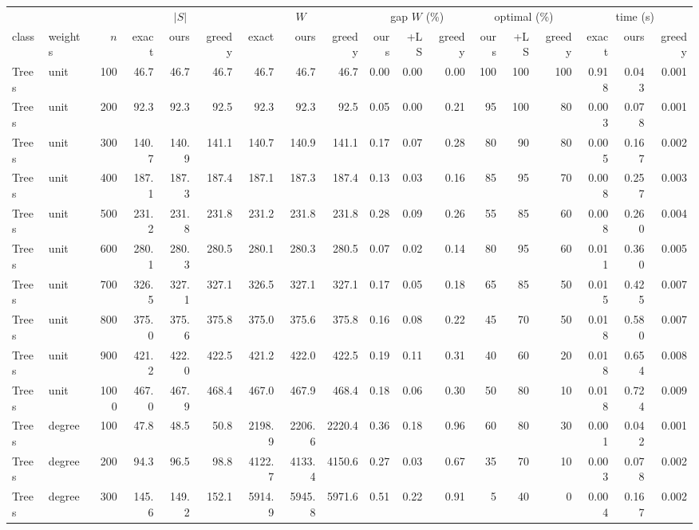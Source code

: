 \begin{tabular}{llr rrr rrr rrr rrr rrr}
\toprule
 & & & \multicolumn{3}{c}{$|S|$} & \multicolumn{3}{c}{$W$} & \multicolumn{3}{c}{gap $W$ (\%)} & \multicolumn{3}{c}{optimal (\%)} & \multicolumn{3}{c}{time (s)} \\
class & weights & $n$ & exact & ours & greedy & exact & ours & greedy & ours & +LS & greedy & ours & +LS & greedy & exact & ours & greedy \\
\midrule
Trees & unit & 100 & 46.7 & 46.7 & 46.7 & 46.7 & 46.7 & 46.7 & 0.00 & 0.00 & 0.00 & 100 & 100 & 100 & 0.918 & 0.043 & 0.001 \\
Trees & unit & 200 & 92.3 & 92.3 & 92.5 & 92.3 & 92.3 & 92.5 & 0.05 & 0.00 & 0.21 & 95 & 100 & 80 & 0.003 & 0.078 & 0.001 \\
Trees & unit & 300 & 140.7 & 140.9 & 141.1 & 140.7 & 140.9 & 141.1 & 0.17 & 0.07 & 0.28 & 80 & 90 & 80 & 0.005 & 0.167 & 0.002 \\
Trees & unit & 400 & 187.1 & 187.3 & 187.4 & 187.1 & 187.3 & 187.4 & 0.13 & 0.03 & 0.16 & 85 & 95 & 70 & 0.008 & 0.257 & 0.003 \\
Trees & unit & 500 & 231.2 & 231.8 & 231.8 & 231.2 & 231.8 & 231.8 & 0.28 & 0.09 & 0.26 & 55 & 85 & 60 & 0.008 & 0.260 & 0.004 \\
Trees & unit & 600 & 280.1 & 280.3 & 280.5 & 280.1 & 280.3 & 280.5 & 0.07 & 0.02 & 0.14 & 80 & 95 & 60 & 0.011 & 0.360 & 0.005 \\
Trees & unit & 700 & 326.5 & 327.1 & 327.1 & 326.5 & 327.1 & 327.1 & 0.17 & 0.05 & 0.18 & 65 & 85 & 50 & 0.015 & 0.425 & 0.007 \\
Trees & unit & 800 & 375.0 & 375.6 & 375.8 & 375.0 & 375.6 & 375.8 & 0.16 & 0.08 & 0.22 & 45 & 70 & 50 & 0.018 & 0.580 & 0.007 \\
Trees & unit & 900 & 421.2 & 422.0 & 422.5 & 421.2 & 422.0 & 422.5 & 0.19 & 0.11 & 0.31 & 40 & 60 & 20 & 0.018 & 0.654 & 0.008 \\
Trees & unit & 1000 & 467.0 & 467.9 & 468.4 & 467.0 & 467.9 & 468.4 & 0.18 & 0.06 & 0.30 & 50 & 80 & 10 & 0.018 & 0.724 & 0.009 \\
Trees & degree & 100 & 47.8 & 48.5 & 50.8 & 2198.9 & 2206.6 & 2220.4 & 0.36 & 0.18 & 0.96 & 60 & 80 & 30 & 0.001 & 0.042 & 0.001 \\
Trees & degree & 200 & 94.3 & 96.5 & 98.8 & 4122.7 & 4133.4 & 4150.6 & 0.27 & 0.03 & 0.67 & 35 & 70 & 10 & 0.003 & 0.078 & 0.002 \\
Trees & degree & 300 & 145.6 & 149.2 & 152.1 & 5914.9 & 5945.8 & 5971.6 & 0.51 & 0.22 & 0.91 & 5 & 40 & 0 & 0.004 & 0.167 & 0.002 \\

\end{tabular}
